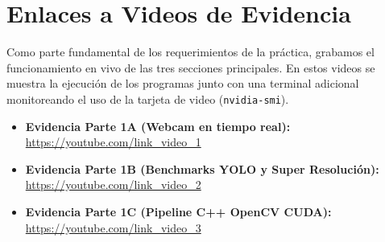 \documentclass[12pt]{article}
\begin{document}
\tableofcontents  
\pagebreak		

\listoftables  
\vspace{1cm}

\listoffigures  

\pagebreak

\begin{abstract}
En este informe presentamos todo el proceso y los resultados que obtuvimos durante la Práctica 4 de Visión por Computador. El objetivo principal de la práctica fue poner a prueba y comparar el rendimiento (como los cuadros por segundo y el uso de memoria RAM y VRAM) de varios modelos de inteligencia artificial ejecutándose tanto en el procesador principal (CPU) como en la tarjeta gráfica (GPU). Además, programamos un flujo de procesamiento de imágenes usando OpenCV en C++ puro con aceleración CUDA. Para asegurar que el trabajo es propio, todas las capturas y videos incluyen la dirección MAC de la computadora donde hicimos las pruebas.

El código fuente de todos los scripts utilizados lo pueden encontrar en el siguiente repositorio de GitHub: \url{https://github.com/tu-usuario/tu-repositorio} %
\end{abstract}

\section{Enlaces a Videos de Evidencia}
Como parte fundamental de los requerimientos de la práctica, grabamos el funcionamiento en vivo de las tres secciones principales. En estos videos se muestra la ejecución de los programas junto con una terminal adicional monitoreando el uso de la tarjeta de video (\texttt{nvidia-smi}).

\begin{itemize}
    \item \textbf{Evidencia Parte 1A (Webcam en tiempo real):} \url{https://youtube.com/link_video_1} %
    \item \textbf{Evidencia Parte 1B (Benchmarks YOLO y Super Resolución):} \url{https://youtube.com/link_video_2} %
    \item \textbf{Evidencia Parte 1C (Pipeline C++ OpenCV CUDA):} \url{https://youtube.com/link_video_3} %
\end{itemize}
\end{document}
